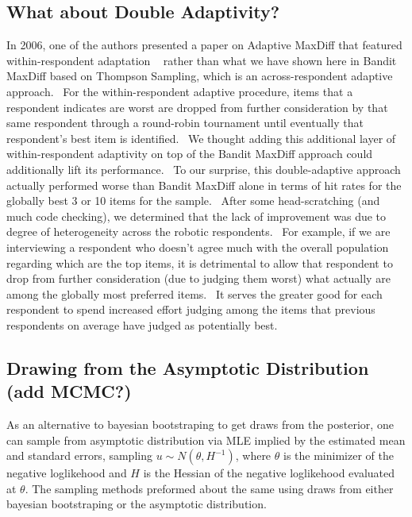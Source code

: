 \documentclass[nonblindrev]{informs3}
\begin{document}
\subsection{What about Double Adaptivity?}
In 2006, one of the authors presented a paper on Adaptive MaxDiff that featured within-respondent adaptation ~\cite{orme2006adaptive} rather than what we have shown here in Bandit MaxDiff based on Thompson Sampling, which is an across-respondent adaptive approach.  For the within-respondent adaptive procedure, items that a respondent indicates are worst are dropped from further consideration by that same respondent through a round-robin tournament until eventually that respondent's best item is identified.  We thought adding this additional layer of within-respondent adaptivity on top of the Bandit MaxDiff approach could additionally lift its performance.  To our surprise, this double-adaptive approach actually performed worse than Bandit MaxDiff alone in terms of hit rates for the globally best 3 or 10 items for the sample.  After some head-scratching (and much code checking), we determined that the lack of improvement was due to degree of heterogeneity across the robotic respondents.  For example, if we are interviewing a respondent who doesn't agree much with the overall population regarding which are the top items, it is detrimental to allow that respondent to drop from further consideration (due to judging them worst) what actually are among the globally most preferred items.  It serves the greater good for each respondent to spend increased effort judging among the items that previous respondents on average have judged as potentially best.
\subsection{Drawing from the Asymptotic Distribution (add MCMC?)}
As an alternative to bayesian bootstraping to get draws from the posterior, one can sample from asymptotic distribution via MLE implied by the estimated mean and standard errors, sampling $u \sim N(\theta,H^{-1})$, where $\theta$ is the minimizer of the negative loglikehood and $H$ is the Hessian of the negative loglikehood evaluated at $\theta$. The sampling methods preformed about the same using draws from either bayesian bootstraping or the asymptotic distribution.
\end{document}

